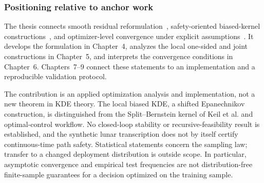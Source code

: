 \subsubsection{Positioning relative to anchor work}\label{ssec:positioning}
The thesis connects smooth residual reformulation~\citep{calfa2015}, safety-oriented biased-kernel constructions~\citep{keil2021}, and optimizer-level convergence under explicit assumptions~\citep{schuster2025}. It develops the formulation in Chapter~4, analyzes the local one-sided and joint constructions in Chapter~5, and interprets the convergence conditions in Chapter~6. Chapters~7--9 connect these statements to an implementation and a reproducible validation protocol.

The contribution is an applied optimization analysis and implementation, not a new theorem in KDE theory. The local biased KDE, a shifted Epanechnikov construction, is distinguished from the Split--Bernstein kernel of Keil et al. and optimal-control workflow. No closed-loop stability or recursive-feasibility result is established, and the synthetic lunar transcription does not by itself certify continuous-time path safety. Statistical statements concern the sampling law; transfer to a changed deployment distribution is outside scope. In particular, asymptotic convergence and empirical test frequencies are not distribution-free finite-sample guarantees for a decision optimized on the training sample.

